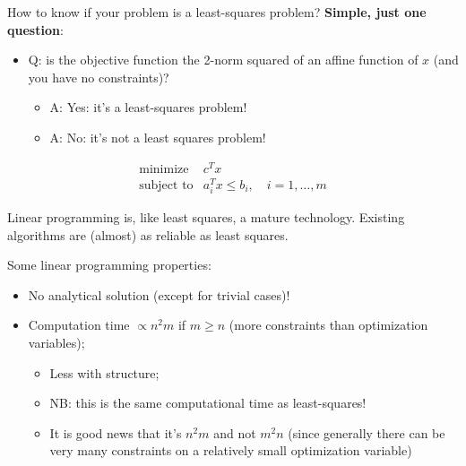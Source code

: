 \message{ !name(document.tex)}\documentclass[twocolumn]{article}
\begin{document}
How to know if your problem is a least-squares problem? \textbf{Simple, just one question}:

\begin{itemize}
\item Q: is the objective function the 2-norm squared of an affine function of $x$ (and you have no constraints)?
  \begin{itemize}
  \item A: Yes: it's a least-squares problem!
  \item A: No: it's not a least squares problem!
  \end{itemize}
\end{itemize}


\begin{Definition}
  $$
  \begin{array}{rl}
    \text{minimize} & c^Tx \\
    \text{subject to} & a_i^Tx\le b_i,\quad i=1,\ldots,m
  \end{array}
  $$
\end{Definition}

Linear programming is, like least squares, a mature technology. Existing algorithms are (almost) as reliable as least squares.

\begin{Fact}
  Some linear programming properties:
  
  \begin{itemize}
  \item No analytical solution (except for trivial cases)!
  \item Computation time $\propto n^2m$ if $m\ge n$ (more constraints than optimization variables);
    \begin{itemize}
    \item Less with structure;
    \item NB: this is the same computational time as least-squares!
    \item It is good news that it's $n^2m$ and not $m^2n$ (since generally there can be very many constraints on a relatively small optimization variable)
    \end{itemize}
  \end{itemize}
\end{Fact}








\end{document}
